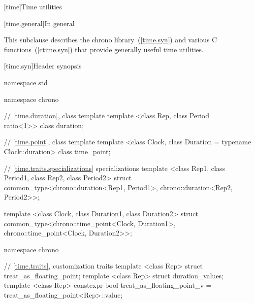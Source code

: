 [time]{Time utilities}

[time.general]{In general}

\pnum
{}%
This subclause describes the chrono library~(\ref{time.syn}) and various C
functions~(\ref{ctime.syn}) that provide generally useful time
utilities.

%
[time.syn]{Header  synopsis}

\begin{codeblock}
namespace std {
  namespace chrono {
    // \ref{time.duration}, class template 
    template <class Rep, class Period = ratio<1>> class duration;

    // \ref{time.point}, class template 
    template <class Clock, class Duration = typename Clock::duration> class time_point;
  }

  // \ref{time.traits.specializations}  specializations
  template <class Rep1, class Period1, class Rep2, class Period2>
    struct common_type<chrono::duration<Rep1, Period1>,
                       chrono::duration<Rep2, Period2>>;

  template <class Clock, class Duration1, class Duration2>
    struct common_type<chrono::time_point<Clock, Duration1>,
                       chrono::time_point<Clock, Duration2>>;

  namespace chrono {
    // \ref{time.traits}, customization traits
    template <class Rep> struct treat_as_floating_point;
    template <class Rep> struct duration_values;
    template <class Rep> constexpr bool treat_as_floating_point_v
      = treat_as_floating_point<Rep>::value;

}}
\end{codeblock}
